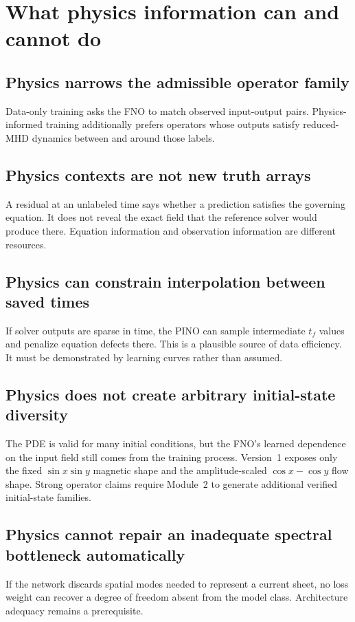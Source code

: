 \documentclass[11pt]{article}
\begin{document}
\section{What physics information can and cannot do}
\label{sec:capability}

\subsection{Physics narrows the admissible operator family}
Data-only training asks the FNO to match observed input-output pairs. Physics-informed training additionally prefers operators whose outputs satisfy reduced-MHD dynamics between and around those labels.

\subsection{Physics contexts are not new truth arrays}
A residual at an unlabeled time says whether a prediction satisfies the governing equation. It does not reveal the exact field that the reference solver would produce there. Equation information and observation information are different resources.

\subsection{Physics can constrain interpolation between saved times}
If solver outputs are sparse in time, the PINO can sample intermediate $t_f$ values and penalize equation defects there. This is a plausible source of data efficiency. It must be demonstrated by learning curves rather than assumed.

\subsection{Physics does not create arbitrary initial-state diversity}
The PDE is valid for many initial conditions, but the FNO's learned dependence on the input field still comes from the training process. Version~1 exposes only the fixed $\sin x\sin y$ magnetic shape and the amplitude-scaled $\cos x-\cos y$ flow shape. Strong operator claims require Module~2 to generate additional verified initial-state families.

\subsection{Physics cannot repair an inadequate spectral bottleneck automatically}
If the network discards spatial modes needed to represent a current sheet, no loss weight can recover a degree of freedom absent from the model class. Architecture adequacy remains a prerequisite.
\end{document}
